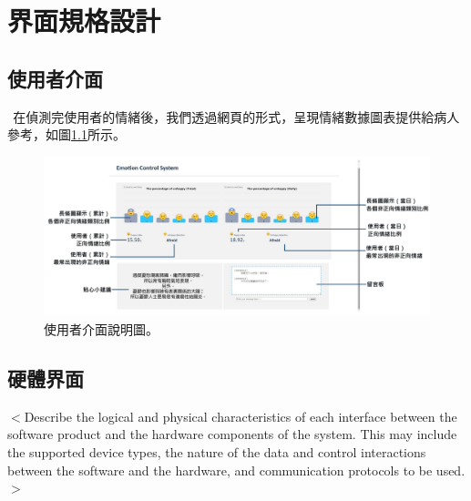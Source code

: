 \documentclass[12pt]{scrreprt}
\begin{document}
\chapter{界面規格設計}

\section{使用者介面}

$~~$在偵測完使用者的情緒後，我們透過網頁的形式，呈現情緒數據圖表提供給病人參考，如圖\ref{fig:UserInterface}所示。

\begin{figure}[!h]
\begin{center}
\includegraphics[width=1\textwidth]{./figs/Web.pdf}
\end{center}
\caption{使用者介面說明圖。}
\label{fig:UserInterface}
\end{figure}



\section{硬體界面}
$<$Describe the logical and physical characteristics of each interface between 
the software product and the hardware components of the system. This may include 
the supported device types, the nature of the data and control interactions 
between the software and the hardware, and communication protocols to be 
used.$>$
\end{document}
